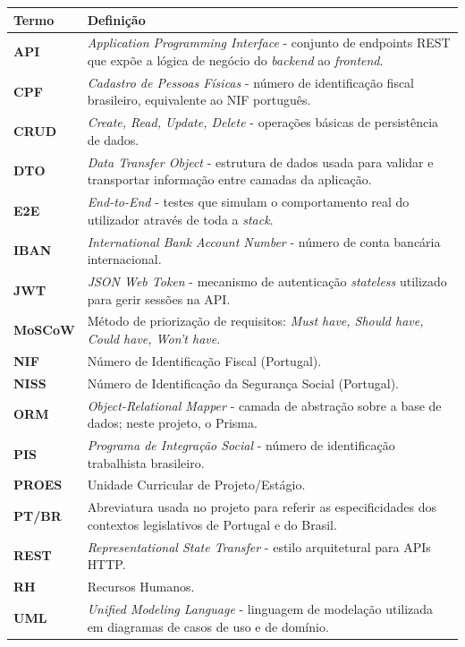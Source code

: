 \documentclass[12pt, a4paper, twoside, openright]{report}
\begin{document}
\begin{table}[!h]
\begin{tabular}{lp{}}
  \toprule
  \textbf{Termo} & \textbf{Definição} \\
  \midrule
  \textbf{API}        & \textit{Application Programming Interface} - conjunto de endpoints REST que expõe a lógica de negócio do \textit{backend} ao \textit{frontend}. \\[4pt]
  \textbf{CPF}        & \textit{Cadastro de Pessoas Físicas} - número de identificação fiscal brasileiro, equivalente ao NIF português. \\[4pt]
  \textbf{CRUD}       & \textit{Create, Read, Update, Delete} - operações básicas de persistência de dados. \\[4pt]
  \textbf{DTO}        & \textit{Data Transfer Object} - estrutura de dados usada para validar e transportar informação entre camadas da aplicação. \\[4pt]
  \textbf{E2E}        & \textit{End-to-End} - testes que simulam o comportamento real do utilizador através de toda a \textit{stack}. \\[4pt]
  \textbf{IBAN}       & \textit{International Bank Account Number} - número de conta bancária internacional. \\[4pt]
  \textbf{JWT}        & \textit{JSON Web Token} - mecanismo de autenticação \textit{stateless} utilizado para gerir sessões na API. \\[4pt]
  \textbf{MoSCoW}     & Método de priorização de requisitos: \textit{Must have, Should have, Could have, Won't have}. \\[4pt]
  \textbf{NIF}        & Número de Identificação Fiscal (Portugal). \\[4pt]
  \textbf{NISS}       & Número de Identificação da Segurança Social (Portugal). \\[4pt]
  \textbf{ORM}        & \textit{Object-Relational Mapper} - camada de abstração sobre a base de dados; neste projeto, o Prisma. \\[4pt]
  \textbf{PIS}        & \textit{Programa de Integração Social} - número de identificação trabalhista brasileiro. \\[4pt]
  \textbf{PROES}      & Unidade Curricular de Projeto/Estágio. \\[4pt]
  \textbf{PT/BR}      & Abreviatura usada no projeto para referir as especificidades dos contextos legislativos de Portugal e do Brasil. \\[4pt]
  \textbf{REST}       & \textit{Representational State Transfer} - estilo arquitetural para APIs HTTP. \\[4pt]
  \textbf{RH}         & Recursos Humanos. \\[4pt]
  \textbf{UML}        & \textit{Unified Modeling Language} - linguagem de modelação utilizada em diagramas de casos de uso e de domínio. \\[4pt]
  \bottomrule
\end{tabular}
\end{table}
\end{document}

